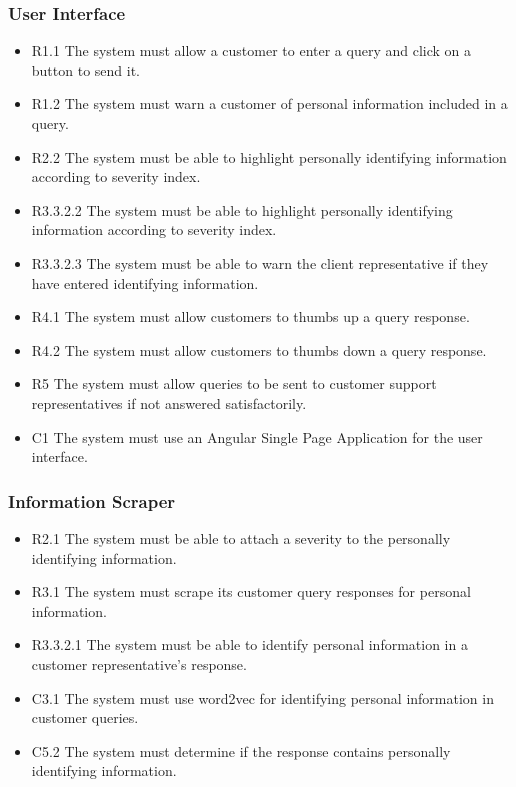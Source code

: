 \documentclass[11pt]{article}
\begin{document}
\subsubsection{User Interface}
\begin{itemize}
  \item[] R1.1 The system must allow a customer to enter a query and click on a button to send it.
  \item[] R1.2 The system must warn a customer of personal information included in a query.
  \item[] R2.2 The system must be able to highlight personally identifying information according to severity index.
  \item[] R3.3.2.2 The system must be able to highlight personally identifying information according to severity index.
  \item[] R3.3.2.3 The system must be able to warn the client representative if they have entered identifying information.
  \item[] R4.1 The system must allow customers to thumbs up a query response.
  \item[] R4.2 The system must allow customers to thumbs down a query response.
  \item[] R5 The system must allow queries to be sent to customer support representatives if not answered satisfactorily.
  \item[] C1 The system must use an Angular Single Page Application for the user interface.
\end{itemize}

\subsubsection{Information Scraper}
\begin{itemize}
  \item[] R2.1 The system must be able to attach a severity to the personally identifying information.
  \item[] R3.1 The system must scrape its customer query responses for personal information.
  \item[] R3.3.2.1 The system must be able to identify personal information in a customer representative's response. 
  \item[] C3.1 The system must use word2vec for identifying personal information in customer queries.
  \item[] C5.2 The system must determine if the response contains personally identifying information.
\end{itemize}
\end{document}
